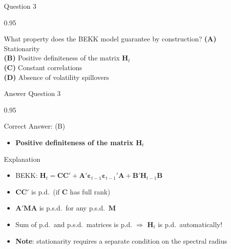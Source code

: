 \documentclass[9pt, aspectratio=169, t]{beamer}
\begin{document}
\begin{frame}{Question 3}
    \begin{cminipage}{0.95\textwidth}
    \begin{block}{What property does the BEKK model guarantee by construction?}
        \textcolor{MainBlue}{\textbf{(A)}} Stationarity\\[3pt]
        \textcolor{MainBlue}{\textbf{(B)}} Positive definiteness of the matrix $\mathbf{H}_t$\\[3pt]
        \textcolor{MainBlue}{\textbf{(C)}} Constant correlations\\[3pt]
        \textcolor{MainBlue}{\textbf{(D)}} Absence of volatility spillovers
    \end{block}
    \end{cminipage}
\end{frame}

\begin{frame}{Answer Question 3}
    \begin{cminipage}{0.95\textwidth}
    \begin{exampleblock}{Correct Answer: (B)}
        \begin{itemize}\setlength{\itemsep}{0pt}
            \item \textbf{Positive definiteness of the matrix $\mathbf{H}_t$}
        \end{itemize}
    \end{exampleblock}

    \pause
    \begin{block}{Explanation}
        \begin{itemize}\setlength{\itemsep}{0pt}
            \item BEKK: $\mathbf{H}_t = \mathbf{C}\mathbf{C}' + \mathbf{A}'\boldsymbol{\varepsilon}_{t-1}\boldsymbol{\varepsilon}_{t-1}'\mathbf{A} + \mathbf{B}'\mathbf{H}_{t-1}\mathbf{B}$
            \item $\mathbf{C}\mathbf{C}'$ is p.d.\ (if $\mathbf{C}$ has full rank)
            \item $\mathbf{A}'\mathbf{M}\mathbf{A}$ is p.s.d.\ for any p.s.d.\ $\mathbf{M}$
            \item Sum of p.d.\ and p.s.d.\ matrices is p.d. $\Rightarrow$ $\mathbf{H}_t$ is p.d.\ automatically!
            \item \textbf{Note}: stationarity requires a separate condition on the spectral radius
        \end{itemize}
    \end{block}
    \end{cminipage}
\end{frame}
\end{document}
